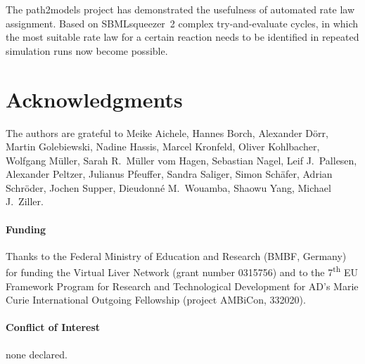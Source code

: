 \documentclass{bioinfo}
\begin{document}
The path2models project \citep{Buechel2013} has demonstrated the usefulness of automated rate law assignment.
Based on SBMLsqueezer~2
complex try-and-evaluate cycles, in which the most suitable rate law for a certain reaction needs to be identified in repeated simulation runs \citep{Draeger2011} now become possible.

\vspace{-.1cm}
\section*{Acknowledgments}

The authors are grateful to Meike Aichele, Hannes Borch, Alexander D\"orr, Martin Golebiewski, Nadine Hassis, Marcel Kronfeld, Oliver Kohlbacher, Wolfgang M\"uller, Sarah R.~M\"uller vom Hagen, Sebastian Nagel, Leif J.~Pallesen, Alexander Peltzer, Julianus Pfeuffer, Sandra Saliger, Simon Sch\"afer, Adrian Schr\"oder, Jochen Supper, Dieudonn\'e M.~Wouamba, Shaowu Yang, Michael J.~Ziller.

\paragraph{Funding\textcolon}
Thanks to the Federal Ministry of Education and Research (BMBF, Germany) for funding the
Virtual Liver Network (grant number 0315756) and to %
the 7\textsuperscript{th} EU Framework Program for Research and Technological Development
for AD's Marie Curie International Outgoing Fellowship
(project AMBiCon, 332020).

\paragraph{Conflict of Interest\textcolon} none declared.
\end{document}
